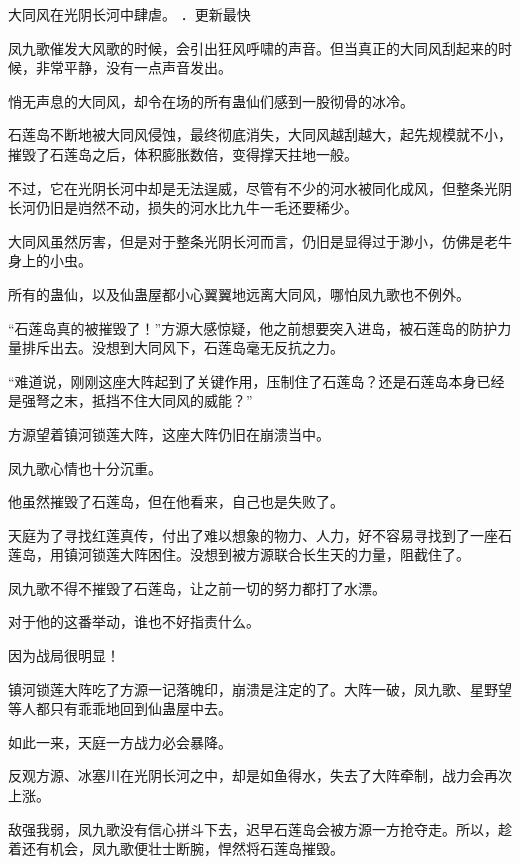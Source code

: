 
\begin{this_body}



大同风在光阴长河中肆虐。 ．更新最快

凤九歌催发大风歌的时候，会引出狂风呼啸的声音。但当真正的大同风刮起来的时候，非常平静，没有一点声音发出。

悄无声息的大同风，却令在场的所有蛊仙们感到一股彻骨的冰冷。

石莲岛不断地被大同风侵蚀，最终彻底消失，大同风越刮越大，起先规模就不小，摧毁了石莲岛之后，体积膨胀数倍，变得撑天拄地一般。

不过，它在光阴长河中却是无法逞威，尽管有不少的河水被同化成风，但整条光阴长河仍旧是岿然不动，损失的河水比九牛一毛还要稀少。

大同风虽然厉害，但是对于整条光阴长河而言，仍旧是显得过于渺小，仿佛是老牛身上的小虫。

所有的蛊仙，以及仙蛊屋都小心翼翼地远离大同风，哪怕凤九歌也不例外。

“石莲岛真的被摧毁了！”方源大感惊疑，他之前想要突入进岛，被石莲岛的防护力量排斥出去。没想到大同风下，石莲岛毫无反抗之力。

“难道说，刚刚这座大阵起到了关键作用，压制住了石莲岛？还是石莲岛本身已经是强弩之末，抵挡不住大同风的威能？”

方源望着镇河锁莲大阵，这座大阵仍旧在崩溃当中。

凤九歌心情也十分沉重。

他虽然摧毁了石莲岛，但在他看来，自己也是失败了。

天庭为了寻找红莲真传，付出了难以想象的物力、人力，好不容易寻找到了一座石莲岛，用镇河锁莲大阵困住。没想到被方源联合长生天的力量，阻截住了。

凤九歌不得不摧毁了石莲岛，让之前一切的努力都打了水漂。

对于他的这番举动，谁也不好指责什么。

因为战局很明显！

镇河锁莲大阵吃了方源一记落魄印，崩溃是注定的了。大阵一破，凤九歌、星野望等人都只有乖乖地回到仙蛊屋中去。

如此一来，天庭一方战力必会暴降。

反观方源、冰塞川在光阴长河之中，却是如鱼得水，失去了大阵牵制，战力会再次上涨。

敌强我弱，凤九歌没有信心拼斗下去，迟早石莲岛会被方源一方抢夺走。所以，趁着还有机会，凤九歌便壮士断腕，悍然将石莲岛摧毁。


\end{this_body}
